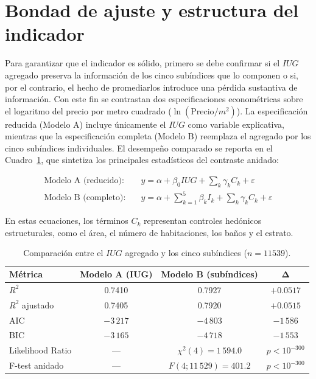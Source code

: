\documentclass[12pt, a4paper, twoside, openright]{report}
\theoremstyle{plain}
\theoremstyle{definition}
\newcommand{\IUG}{IUG}             %
\begin{document}
\section{Bondad de ajuste y estructura del indicador}\label{sec:bondad_validez}

Para garantizar que el indicador es sólido, primero se debe confirmar si el $\IUG$ agregado preserva la información de los cinco subíndices que lo componen o si, por el contrario, el hecho de promediarlos introduce una pérdida sustantiva de información. Con este fin se contrastan dos especificaciones econométricas sobre el logaritmo del precio por metro cuadrado ($\ln(\text{Precio}/m^2)$). La especificación reducida (Modelo A) incluye únicamente el $\IUG$ como variable explicativa, mientras que la especificación completa (Modelo B) reemplaza el agregado por los cinco subíndices individuales. El desempeño comparado se reporta en el Cuadro~\ref{tab:nested_validez}, que sintetiza los principales estadísticos del contraste anidado:

\begin{align}
    \text{Modelo A (reducido):} \quad & y = \alpha + \beta_0 \IUG + \sum_{k} \gamma_k C_k + \varepsilon \\
    \text{Modelo B (completo):} \quad & y = \alpha + \sum_{k=1}^{5} \beta_k I_k + \sum_{k} \gamma_k C_k + \varepsilon
\end{align}

En estas ecuaciones, los términos $C_k$ representan controles hedónicos estructurales, como el área, el número de habitaciones, los baños y el estrato.

\begin{table}[htbp]
\centering
\caption{Comparación entre el $\IUG$ agregado y los cinco subíndices ($n = \num{11539}$).}
\label{tab:nested_validez}
\small
\begin{tabular}{@{}lccc@{}}
\toprule
\textbf{Métrica} & \textbf{Modelo A (IUG)} & \textbf{Modelo B (subíndices)} & $\boldsymbol{\Delta}$ \\
\midrule
$R^2$              & 0.7410 & 0.7927 & $+0.0517$ \\
$R^2$ ajustado     & 0.7405 & 0.7920 & $+0.0515$ \\
AIC                & $-3\,217$ & $-4\,803$ & $-1\,586$ \\
BIC                & $-3\,165$ & $-4\,718$ & $-1\,553$ \\
Likelihood Ratio   & --- & $\chi^2(4) = 1\,594.0$ & $p < 10^{-300}$ \\
F-test anidado     & --- & $F(4; 11\,529) = 401.2$ & $p < 10^{-300}$ \\
\bottomrule
\end{tabular}
\end{table}
\end{document}
